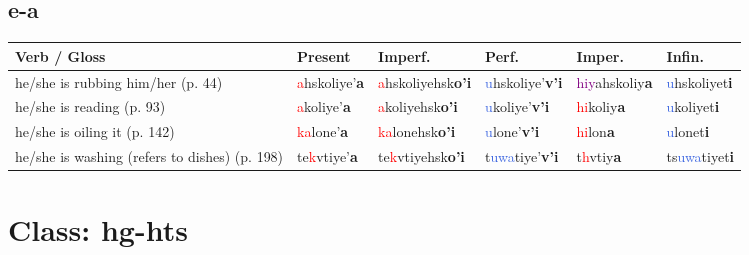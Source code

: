 \documentclass[oneside,openany]{book}%
\begin{document}
\subsection*{e-a}%
\begin{tabularx}{\textwidth}{>{\hsize=1.5\hsize\RaggedRight}X >{\hsize=0.9\hsize}X >{\hsize=0.9\hsize}X >{\hsize=0.9\hsize}X >{\hsize=0.9\hsize}X >{\hsize=0.9\hsize}X}%
\toprule%
\textbf{Verb / Gloss}&\textbf{Present}&\textbf{Imperf.}&\textbf{Perf.}&\textbf{Imper.}&\textbf{Infin.}\\%
\midrule%
he/she is rubbing him/her (p. 44)&\textcolor{Red}{a}hskoliye'\textbf{a}&\textcolor{Red}{a}hskoliyehsk\textbf{o'i}&\textcolor{RoyalBlue}{u}hskoliye'\textbf{v'i}&\textcolor{Purple}{hiy}ahskoliy\textbf{a}&\textcolor{RoyalBlue}{u}hskoliyet\textbf{i}\\%
he/she is reading (p. 93)&\textcolor{Red}{a}koliye'\textbf{a}&\textcolor{Red}{a}koliyehsk\textbf{o'i}&\textcolor{RoyalBlue}{u}koliye'\textbf{v'i}&\textcolor{Red}{hi}koliy\textbf{a}&\textcolor{RoyalBlue}{u}koliyet\textbf{i}\\%
he/she is oiling it (p. 142)&\textcolor{Red}{ka}lone'\textbf{a}&\textcolor{Red}{ka}lonehsk\textbf{o'i}&\textcolor{RoyalBlue}{u}lone'\textbf{v'i}&\textcolor{Red}{hi}lon\textbf{a}&\textcolor{RoyalBlue}{u}lonet\textbf{i}\\%
he/she is washing (refers to dishes) (p. 198)&te\textcolor{Red}{k}vtiye'\textbf{a}&te\textcolor{Red}{k}vtiyehsk\textbf{o'i}&t\textcolor{RoyalBlue}{uwa}tiye'\textbf{v'i}&t\textcolor{Red}{h}vtiy\textbf{a}&ts\textcolor{RoyalBlue}{uwa}tiyet\textbf{i}\\%
\bottomrule%
\end{tabularx}%
\vspace{1em}%
\needspace{3in}%
\section*{Class: hg-hts}%
%
\needspace{1in}%
\end{document}
